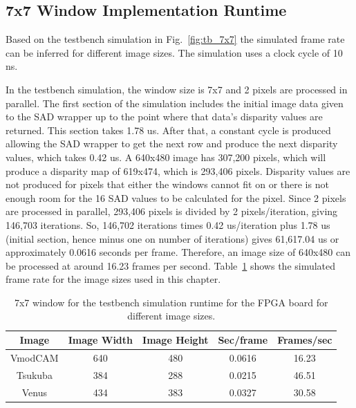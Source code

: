 \subsection{7x7 Window Implementation Runtime}
\label{sec:testbench7x7}

Based on the testbench simulation in Fig.~\ref{fig:tb_7x7} the simulated frame rate can be inferred for different image sizes. The simulation uses a clock cycle of 10 ns.

In the testbench simulation, the window size is 7x7 and 2 pixels are processed in parallel. The first section of the simulation includes the initial image data given to the SAD wrapper up to the point where that data's disparity values are returned. This section takes 1.78 us. After that, a constant cycle is produced allowing the SAD wrapper to get the next row and produce the next disparity values, which takes 0.42 us. A 640x480 image has 307,200 pixels, which will produce a disparity map of 619x474, which is 293,406 pixels. Disparity values are not produced for pixels that either the windows cannot fit on or there is not enough room for the 16 SAD values to be calculated for the pixel. Since 2 pixels are processed in parallel, 293,406 pixels is divided by 2 pixels/iteration, giving 146,703 iterations. So, 146,702 iterations times 0.42 us/iteration plus 1.78 us (initial section, hence minus one on number of iterations) gives 61,617.04 us or approximately 0.0616 seconds per frame. Therefore, an image size of 640x480 can be processed at around 16.23 frames per second. Table~\ref{table:tb_7x7} shows the simulated frame rate for the image sizes used in this chapter.

\begin{table}
	\begin{center}
		\begin{tabular}{|c|c|c|c|c|}
			\hline
				\rowstyle{\bfseries} Image & 
				\rowstyle{\bfseries} Image Width & 
				\rowstyle{\bfseries} Image Height & 
				\rowstyle{\bfseries} Sec/frame & 
				\rowstyle{\bfseries} Frames/sec
			\\ \hline 
			VmodCAM & 640 & 480 & 0.0616 & 16.23
			\\ \hline 
			Tsukuba & 384 & 288 & 0.0215 & 46.51
			\\ \hline 
			Venus & 434 & 383 & 0.0327 & 30.58
			\\ \hline 
		\end{tabular}	
		\captionfonts
		\caption{7x7 window for the testbench simulation runtime for the FPGA board for different image sizes.}
		\label{table:tb_7x7}
	\end{center}
\end{table}

